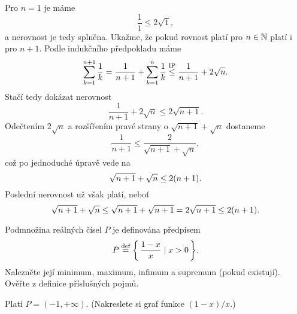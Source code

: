 \documentclass[answers]{exam}
\begin{document}
\begin{questions}
  \begin{solution}
    Pro $n = 1$ je máme
    \begin{equation*}
      \frac{1}{1} \le 2 \sqrt{1},
    \end{equation*}
    a nerovnost je tedy splněna. Ukažme, že pokud rovnost platí pro $n \in \mathbb{N}$ platí i pro $n + 1$. Podle indukčního předpokladu máme
    \begin{equation*}
      \sum_{k=1}^{n + 1} \frac{1}{k}
      =
      \frac{1}{n + 1} + \sum_{k=1}^{n} \frac{1}{k}
      \stackrel{\text{IP}}{\le}
      \frac{1}{n + 1} + 2 \sqrt{n}.
    \end{equation*}
    Stačí tedy dokázat nerovnost
    \begin{equation*}
      \frac{1}{n + 1} + 2 \sqrt{n}
      \le
      2 \sqrt{n + 1}.
    \end{equation*}
    Odečtením $2 \sqrt{n}$ a rozšířením pravé strany o $\sqrt{n + 1} + \sqrt{n}$ dostaneme
    \begin{equation*}
      \frac{1}{n + 1}
      \le
      \frac{2}{\sqrt{n + 1} + \sqrt{n}},
    \end{equation*}
    což po jednoduché úpravě vede na
    \begin{equation*}
      \sqrt{n + 1} + \sqrt{n}
      \le
      2 \parens{n + 1}.
    \end{equation*}
    Poslední nerovnost už však platí, neboť
    \begin{equation*}
      \sqrt{n + 1} + \sqrt{n} 
      \le 
      \sqrt{n + 1} + \sqrt{n + 1}
      =
      2 \sqrt{n + 1}
      \le
      2 \parens{n + 1}.
    \end{equation*}
  \end{solution}
  
  \question[2] Podmnožina reálných čísel $P$ je definována předpisem
  \begin{equation*}
    P \defeq \set{\frac{1 - x}{x}}{x > 0}.
  \end{equation*}
  Nalezněte její minimum, maximum, infimum a supremum (pokud existují). Ověřte z definice příslušných pojmů.
  
  \begin{solution}
    Platí $P = (-1, +\infty)$. (Nakreslete si graf funkce $(1 - x) / x$.)
    

\end{solution}
\end{questions}
\end{document}
